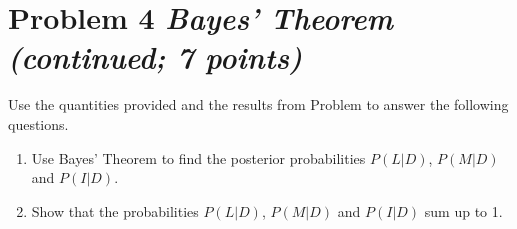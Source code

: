 \documentclass[11pt,twoside]{article}
\newcommand{\pts}[1]{\marginpar{ \small\hspace{0pt} \textit{[#1]} } }
\numberwithin{equation}{section}
\newcommand{\?}{\stackrel{?}{=}}
\begin{document}
\eject
\section*{Problem 4 \textit{Bayes' Theorem (continued; 7 points)}}
Use the quantities provided and the results from Problem to answer the following questions.
\begin{enumerate}[\bf (a)]
\item Use Bayes' Theorem to find the posterior probabilities $P(L|D)$, $P(M|D)$ and $P(I|D)$.\pts{6}
  \vspace{50ex}

\item Show that the probabilities $P(L|D)$, $P(M|D)$ and $P(I|D)$ sum up to 1. \pts{1}
  \vspace{15ex}


\end{enumerate}

  

 


  
  
\end{document}
